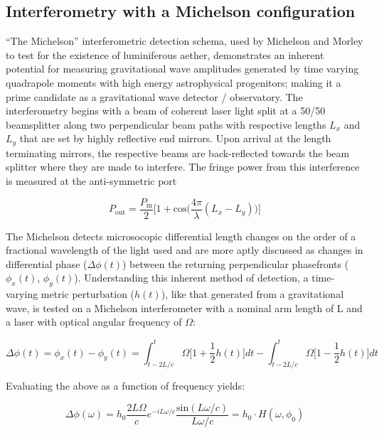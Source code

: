 \subsection{Interferometry with a Michelson configuration}
``The Michelson'' interferometric detection schema, used by Michelson and Morley to test for the existence of luminiferous aether, demonstrates an inherent potential for measuring gravitational wave amplitudes generated by time varying quadrapole moments with high energy astrophysical progenitors; making it a prime candidate as a gravitational wave detector / observatory. The interferometry begins with a beam of coherent laser light split at a 50/50 beamsplitter along two perpendicular beam paths with respective lengths $L_x$ and $L_y$ that are set by highly reflective end mirrors. Upon arrival at the length terminating mirrors, the respective beams are back-reflected towards the beam splitter where they are made to interfere. The fringe power from this interference is measured at the anti-symmetric port 


\begin{equation}\label{P_MICH_AS}
	P_\mathrm{out} = \frac{P_\mathrm{in}}{2} \bigg[1+\mathrm{cos}\Big(\frac{4\pi}{\lambda} (L_x - L_y)\Big) \bigg]
\end{equation}

The Michelson detects microsocopic differential length changes on the order of a fractional wavelength of the light used and are more aptly discussed as changes in differential phase ($\Delta \phi(t)$) between the returning perpendicular phasefronts ($\phi_x(t)$, $\phi_y(t)$). Understanding this inherent method of detection, a time-varying metric perturbation ($h(t)$), like that generated from a gravitational wave, is tested on a Michelson interferometer with a nominal arm length of L and a laser with optical angular frequency of $\Omega$:

\begin{equation}
\Delta \phi(t) = \phi_x(t) - \phi_y(t) =  \int_{t-2L/c}^{t} \Omega \bigg[1 + \frac{1}{2}h(t)\bigg]dt - \int_{t-2L/c}^{t} \Omega \bigg[1 - \frac{1}{2}h(t)\bigg]dt 
\end{equation}

Evaluating the above as a function of frequency yields:

\begin{equation}\label{MICH_del_phi}
	\Delta \phi (\omega) = h_0\frac{2 L \Omega}{c}e^{-i L \omega / c} \frac{\mathrm{sin}(L \omega /c)}{L \omega /c} = h_0 \cdot H(\omega, \phi_0)
\end{equation}

